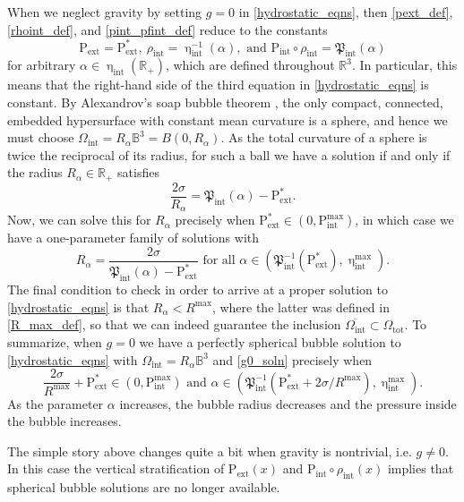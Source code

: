 \documentclass[11pt,reqno]{amsart}
\numberwithin{equation}{section}
\newcommand{\m}{\mathrm}
\def\pint{\m{P}_{\m{int}}}
\def\pfint{\mathfrak{P}_{\m{int}}}
\def\hint{\upeta_{\m{int}}}
\def\pext{\m{P}_{\m{ext}}}
\def\R{\mathbb{R}}
\begin{document}
When we neglect gravity by setting $g =0$ in \eqref{hydrostatic_eqns}, then \eqref{pext_def}, \eqref{rhoint_def}, and \eqref{pint_pfint_def} reduce to the constants
\begin{equation}\label{g0_soln}
 \pext = \pext^\ast, \ \rho_{\m{int}} = \hint^{-1}(\alpha), \text{ and } \pint \circ \rho_{\m{int}} = \pfint(\alpha)  
\end{equation}
for arbitrary $\alpha \in \hint(\R_+)$, which are defined throughout $\R^3$. In particular, this means that the right-hand side of the third equation in \eqref{hydrostatic_eqns} is constant. By Alexandrov's soap bubble theorem \cite{A_1958}, the only compact, connected, embedded hypersurface with constant mean curvature is a sphere, and hence we must choose $\Omega_{\m{int}} = R_\alpha \mathbb{B}^3 = B(0,R_\alpha)$.  As the total curvature of a sphere is twice the reciprocal of its radius,  for such a ball we have a solution if and only if the radius  $R_\alpha \in \R_+$ satisfies
\begin{equation}
 \frac{2\sigma}{R_\alpha} = \pfint(\alpha) - \pext^\ast.
\end{equation}
Now, we can solve this for $R_\alpha$ precisely when $\pext^\ast \in (0, \pint^{\m{max}})$, in which case we have a one-parameter family of solutions with 
\begin{equation}\label{Ralpha_def}
 R_\alpha = \frac{2\sigma}{\pfint(\alpha) - \pext^\ast} \text{ for all } \alpha \in (\pfint^{-1}(\pext^\ast)  ,\hint^{\m{max}}).
\end{equation}
The final condition to check in order to arrive at a proper solution to \eqref{hydrostatic_eqns} is that $R_\alpha <  R^{\m{max}}$, where the latter was defined in \eqref{R_max_def}, so that we can indeed guarantee the inclusion $\overline{\Omega_{\m{int}}} \subset \Omega_{\m{tot}}$.  To summarize, when $g=0$ we have a perfectly spherical bubble solution to \eqref{hydrostatic_eqns} with $\Omega_{\m{int}} = R_\alpha \mathbb{B}^3$ and \eqref{g0_soln} precisely when 
\begin{equation}\label{g0_alpha_range}
 \frac{2\sigma}{R^{\m{max}}} + \pext^\ast \in (0,\pint^{\m{max}}) \text{ and } \alpha \in (\pfint^{-1}(\pext^\ast + 2\sigma /R^{\m{max}} )  ,\hint^{\m{max}}).
\end{equation}
As the parameter $\alpha$ increases, the bubble radius decreases and the pressure inside the bubble increases. 

The simple story above changes quite a bit when gravity is nontrivial, i.e. $g \neq 0$.  In this case the vertical stratification of $\pext(x)$ and $\pint\circ \rho_{\m{int}}(x)$ implies that spherical bubble solutions are no longer available.  
\end{document}
